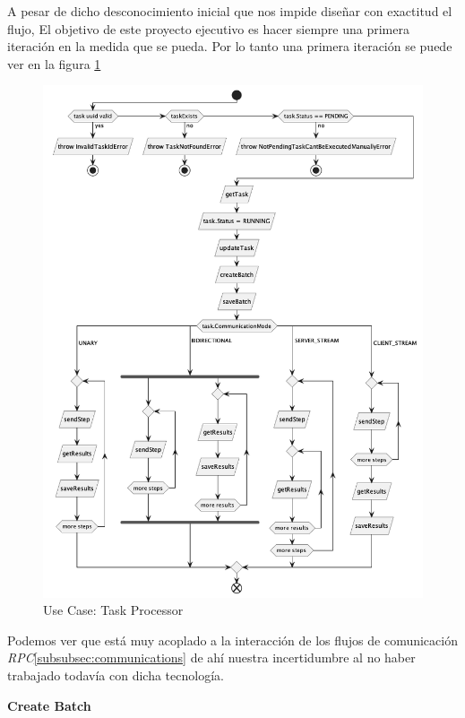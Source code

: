 A pesar de dicho desconocimiento inicial que nos impide diseñar con exactitud el flujo, El objetivo de este proyecto ejecutivo es hacer siempre una primera iteración en la medida que se pueda. Por lo tanto una primera iteración se puede ver en la figura \ref{fig:Use Case-Task Processor}

\begin{figure}[H]
    \centering
    \includegraphics[height=0.55\textheight]{./part/Proyecto_ejecutivo/memoria_descriptiva/descripcionDelProyecto/manager/uml/1-TaskProcessor}
    \caption{Use Case: Task Processor}\label{fig:Use Case-Task Processor}
\end{figure}

Podemos ver que está muy acoplado a la interacción de los flujos de comunicación \textit{RPC}\ref{subsubsec:communications} de ahí nuestra incertidumbre al no haber trabajado todavía con dicha tecnología.

\textbf{Create Batch}

